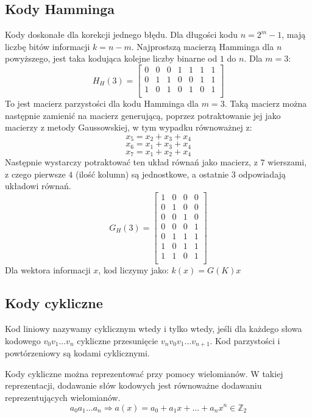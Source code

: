 \documentclass{../notatki}
\begin{document}
\subsection{Kody Hamminga}

Kody doskonałe dla korekcji jednego błędu.
Dla długości kodu $n = 2^m - 1$, mają liczbę bitów informacji $k = n - m$.
Najprostszą macierzą Hamminga dla $n$ powyższego, jest taka kodująca kolejne
liczby binarne od $1$ do $n$. Dla $m = 3$:
$$
H_H(3) =
\begin{bmatrix}
  0 & 0 & 0 & 1 & 1 & 1 & 1 \\
  0 & 1 & 1 & 0 & 0 & 1 & 1 \\
  1 & 0 & 1 & 0 & 1 & 0 & 1 \\
\end{bmatrix}
$$
To jest macierz parzystości dla kodu Hamminga dla $m = 3$.
Taką macierz można następnie zamienić na macierz generującą, poprzez
potraktowanie jej jako macierzy z metody Gaussowskiej, w tym wypadku równoważnej
z:
$$
x_5 = x_2 + x_3 + x_4
$$
$$
x_6 = x_1 + x_3 + x_4
$$
$$
x_7 = x_1 + x_2 + x_4
$$
Następnie wystarczy potraktować ten układ równań jako macierz, z $7$ wierszami,
z czego pierwsze $4$ (ilość kolumn) są jednostkowe, a ostatnie $3$ odpowiadają
układowi równań.
$$
G_H(3) =
\begin{bmatrix}
  1 & 0 & 0 & 0 \\
  0 & 1 & 0 & 0 \\
  0 & 0 & 1 & 0 \\
  0 & 0 & 0 & 1 \\
  0 & 1 & 1 & 1 \\
  1 & 0 & 1 & 1 \\
  1 & 1 & 0 & 1 \\
\end{bmatrix}
$$
Dla wektora informacji $x$, kod liczymy jako: $k(x) = G(K)x$

\subsection{Kody cykliczne}

Kod liniowy nazywamy cyklicznym wtedy i tylko wtedy, jeśli dla każdego słowa
kodowego $v_0v_1 \dots v_n$ cykliczne przesunięcie $v_{n}v_0v_1\dots v_{n + 1}$.
Kod parzystości i powtórzeniowy są kodami cyklicznymi.

Kody cykliczne można reprezentować przy pomocy wielomianów. W takiej
reprezentacji, dodawanie słów kodowych jest równoważne dodawaniu
reprezentujących wielomianów.
$$
a_0a_1\dots a_n \Rightarrow a(x) = a_0 + a_1x + \dots + a_nx^n \in \mathbb{Z}_2
$$
\end{document}
